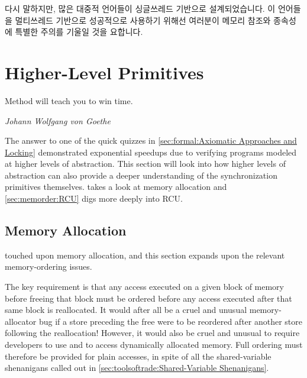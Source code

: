 다시 말하지만, 많은 대중적 언어들이 싱글쓰레드 기반으로 설계되었습니다.
이 언어들을 멀티쓰레드 기반으로 성공적으로 사용하기 위해선 여러분이 메모리
참조와 종속성에 특별한 주의를 기울일 것을 요합니다.

\section{Higher-Level Primitives}
\label{sec:memorder:Higher-Level Primitives}
%
\epigraph{Method will teach you to win time.}
	 {\emph{Johann Wolfgang von Goethe}}

The answer to one of the quick quizzes in
\cref{sec:formal:Axiomatic Approaches and Locking}
demonstrated exponential speedups due to verifying programs
modeled at higher levels of abstraction.
This section will look into how higher levels of abstraction can
also provide a deeper understanding of the synchronization primitives
themselves.
takes a look at memory allocation and
\cref{sec:memorder:RCU}
digs more deeply into RCU\@.

\subsection{Memory Allocation}
\label{sec:memorder:Memory Allocation}

touched upon memory allocation, and this section expands upon the relevant
memory-ordering issues.

The key requirement is that any access executed on a given block of
memory before freeing that block must be ordered before any access
executed after that same block is reallocated.
It would after all be a cruel and unusual memory-allocator bug if a store
preceding the free were to be reordered after another store following
the reallocation!
However, it would also be cruel and unusual to require developers to use
 and  to access dynamically allocated
memory.
Full ordering must therefore be provided for plain accesses, in spite of
all the shared-variable shenanigans called out in
\cref{sec:toolsoftrade:Shared-Variable Shenanigans}.

